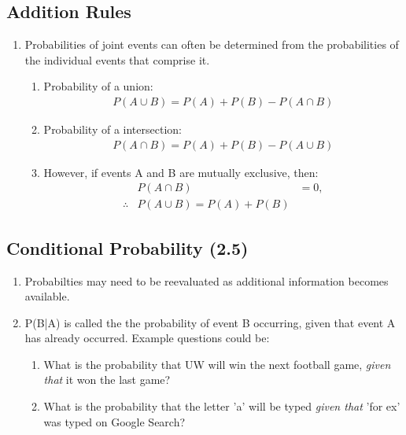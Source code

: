 \documentclass[../INDE315.tex]{subfiles}
\begin{document}
\subsection*{Addition Rules}
\begin{enumerate}
    \item Probabilities of joint events can often be determined from the probabilities of the individual events that comprise it.
        \begin{enumerate}
            \item Probability of a union:
                \begin{equation*}
                    \begin{aligned}
                        P(A \cup B) = P(A) + P(B) - P(A \cap B) 
                    \end{aligned}
                \end{equation*}
            \item Probability of a intersection:
                \begin{equation*}
                    \begin{aligned}
                        P(A \cap B) = P(A) + P(B) - P(A \cup B) 
                    \end{aligned}
                \end{equation*}
            \item However, if events A and B are mutually exclusive, then:
                \begin{equation*}
                    \begin{aligned}
                        & P(A \cap B) &= 0, \\
                        \therefore & P(A \cup B) = P(A) + P(B)
                    \end{aligned}
                \end{equation*}
        \end{enumerate}
\end{enumerate}


\subsection*{Conditional Probability (2.5)}
\begin{enumerate}
    \item Probabilties may need to be reevaluated as additional information becomes available.
    \item P(B|A) is called the the probability of event B occurring, given that event A has already occurred. Example questions could be:
        \begin{enumerate}
            \item What is the probability that UW will win the next football game, \emph{given that} it won the last game?
            \item What is the probability that the letter 'a' will be typed \emph{given that} 'for ex' was typed on Google Search?
        \end{enumerate}
\end{enumerate}
\end{document}
